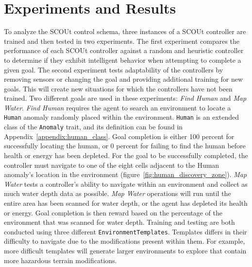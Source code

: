 

\chapter{Experiments and Results} \label{ch:experiments_and_results}
To analyze the SCOUt control schema, three instances of a SCOUt controller are trained and then tested in two experiments.
The first experiment compares the performance of each SCOUt controller against a random and heuristic controller to determine if they exhibit intelligent behavior when attempting to complete a given goal.
The second experiment tests adaptability of the controllers by removing sensors or changing the goal and providing additional training for new goals.
This will create new situations for which the controllers have not been trained.
Two different goals are used in these experiments: \textit{Find Human} and \textit{Map Water}.
\textit{Find Human} requires the agent to search an environment to locate a \texttt{Human} anomaly randomly placed within the environment.
\texttt{Human} is an extended class of the \texttt{Anomaly} trait, and its definition can be found in Appendix~\ref{appendix:human_class}.
Goal completion is either 100 percent for successfully locating the human, or 0 percent for failing to find the human before health or energy has been depleted.
For the goal to be successfully completed, the controller must navigate to one of the eight cells adjacent to the Human anomaly's location in the environment (figure~\ref{fig:human_discovery_zone}).
\textit{Map Water} tests a controller's ability to navigate within an environment and collect as much water depth data as possible.
\textit{Map Water} operations will run until the entire area has been scanned for water depth, or the agent has depleted its health or energy.
Goal completion is then reward based on the percentage of the environment that was scanned for water depth.
Training and testing are both conducted using three different \texttt{EnvironmentTemplates}.
Templates differs in their difficulty to navigate due to the modifications present within them.
For example, more difficult templates will generate larger environments to explore that contain more hazardous terrain modifications.

